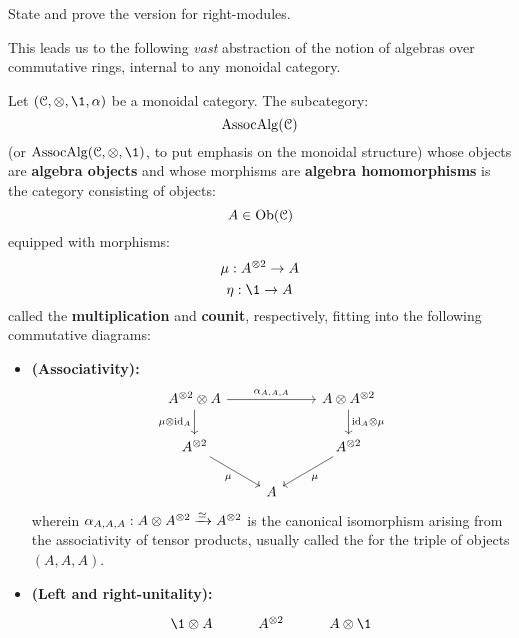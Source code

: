 \begin{question}
\begin{enumerate}
                State and prove the version for right-modules.
            \end{enumerate}
        \end{question}

        This leads us to the following \textit{vast} abstraction of the notion of algebras over commutative rings, internal to any monoidal category.
        \begin{definition} \label{def: algebras_in_monoidal_categories}
            Let $(\C, \tensor, \1, \alpha)$ be a monoidal category. The subcategory:
                $$\Assoc\Alg(\C)$$
            (or $\Assoc\Alg(\C, \tensor, \1)$, to put emphasis on the monoidal structure) whose objects are \textbf{algebra objects} and whose morphisms are \textbf{algebra homomorphisms} is the category consisting of objects:
                $$A \in \Ob(\C)$$
            equipped with morphisms:
                $$\mu: A^{\tensor 2} \to A$$
                $$\eta: \1 \to A$$
            called the \textbf{multiplication} and \textbf{counit}, respectively, fitting into the following commutative diagrams:
            \begin{itemize}
                \item \textbf{(Associativity):}
                    $$
                        \begin{tikzcd}
                        {A^{\tensor 2} \tensor A} && {A \tensor A^{\tensor 2}} \\
                        {A^{\tensor 2}} && {A^{\tensor 2}} \\
                        & A
                        \arrow["{\alpha_{A, A, A}}", from=1-1, to=1-3]
                        \arrow["{\mu \tensor \id_A}"', from=1-1, to=2-1]
                        \arrow["{\id_A \tensor \mu}", from=1-3, to=2-3]
                        \arrow["\mu"', from=2-1, to=3-2]
                        \arrow["\mu", from=2-3, to=3-2]
                        \end{tikzcd}
                    $$
                wherein $\alpha_{A, A, A}: A \tensor A^{\tensor 2} \xrightarrow[]{\cong} A^{\tensor 2}$ is the canonical isomorphism arising from the associativity of tensor products, usually called the  for the triple of objects $(A, A, A)$. 
                \item \textbf{(Left and right-unitality):}
                    $$
                        \begin{tikzcd}
                        {\1 \tensor A} & {A^{\tensor 2}} & {A \tensor \1} \\

\end{tikzcd}$$
\end{itemize}
\end{definition}
